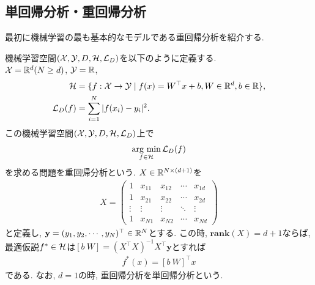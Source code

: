 \subsection{単回帰分析・重回帰分析}
最初に機械学習の最も基本的なモデルである重回帰分析を紹介する. 
\begin{Ex}[重回帰分析]
    機械学習空間$(\mathcal{X}, \mathcal{Y}, D, \mathcal{H}, \mathcal{L}_{D})$を以下のように定義する.\\
    $\mathcal{X} = \mathbb{R}^d(N\geq d)$, $\mathcal{Y} = \mathbb{R}$, 
    \begin{align*}
        \mathcal{H} &= \{f:\mathcal{X}\to\mathcal{Y}\mid f(x) = W^{\top}x + b, W\in\mathbb{R}^{d}, b\in\mathbb{R}\},\\
        \mathcal{L}_{D}(f) &= \sum_{i = 1}^{N}|f(x_i) - y_i|^2.
    \end{align*}
    この機械学習空間$(\mathcal{X}, \mathcal{Y}, D, \mathcal{H}, \mathcal{L}_{D})$上で
    \begin{align*}
        \mathop{\rm arg~min}\limits_{f\in\mathcal{H}}\mathcal{L}_{D}(f)
    \end{align*}
    を求める問題を重回帰分析という. $X\in\mathbb{R}^{N\times(d + 1)}$を
    \begin{align*}
        X = \begin{pmatrix}
            1 & x_{11} & x_{12} & \cdots & x_{1d}\\
            1 & x_{21} & x_{22} & \cdots & x_{2d}\\
            \vdots & \vdots & \vdots & \ddots & \vdots\\
            1 & x_{N1} & x_{N2} & \cdots & x_{Nd}
        \end{pmatrix}
    \end{align*}
    と定義し, $\mathbf{y} = (y_{1}, y_{2}, \cdots, y_{N})^{\top}\in\mathbb{R}^{N}$とする. この時, $\mathbf{rank}(X) = d + 1$ならば, 
    最適仮説$f^*\in\mathcal{H}$は$[b~W] = (X^\top X)^{-1}X^\top\mathbf{y}$とすれば
    \begin{align*}
        f^{*}(x) = [b~W]^{\top}x
    \end{align*}
    である. なお, $d = 1$の時, 重回帰分析を単回帰分析という.
\end{Ex}
